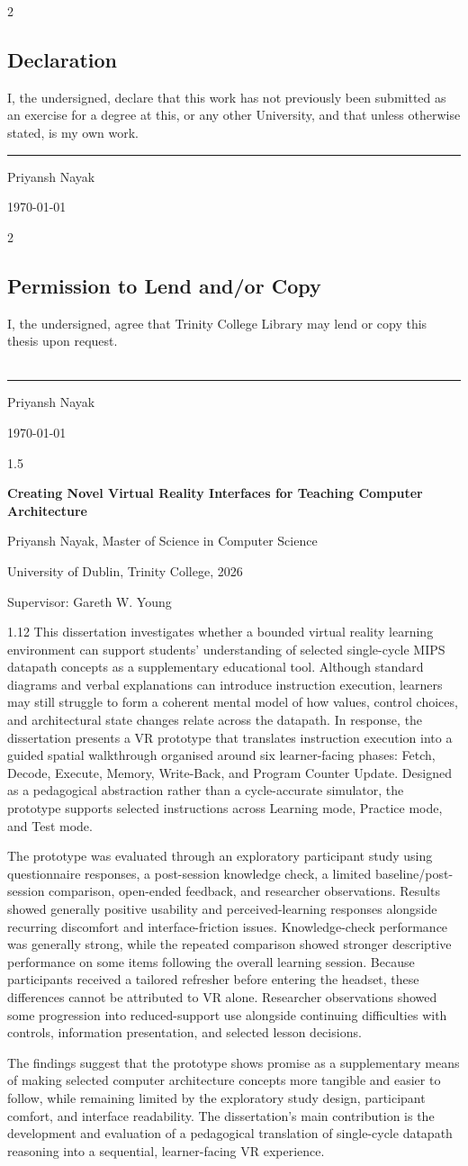 \documentclass[a4paper,12pt,oneside]{report}
\renewcommand{\thesisuniversity}{University of Dublin, Trinity College}
\renewcommand{\thesisauthor}{Priyansh Nayak}
\renewcommand{\thesisyear}{2026}
\renewcommand{\thesistitle}{Creating Novel Virtual Reality Interfaces for Teaching Computer Architecture}
\renewcommand{\thesissupervisor}{Gareth W. Young}
\renewcommand{\thesisdegree}{Master of Science in Computer Science}
\renewcommand{\thesisdeclarationpage}{{
    \thispagestyle{empty}
    \begin{spacing}{2}
    \begin{center}
        \section*{Declaration}
    \end{center}
    \vspace{26mm}

    I, the undersigned, declare that this work has not previously been submitted as an
    exercise for a degree at this, or any other University, and that unless otherwise
    stated, is my own work.

    \vspace{26mm}
    \begin{flushright}
    \begin{minipage}{67mm}
    \raggedright
    \rule{\linewidth}{0.4pt}\par
    \thesisauthor\par
    \vspace{1mm}
    {\today}\par
    \end{minipage}
    \end{flushright}
    \end{spacing}
    \newpage}}
\newcommand{\thesispermissionpage}{{
    \thispagestyle{empty}
    \begin{spacing}{2}
    \begin{center}
        \section*{Permission to Lend and/or Copy}
    \end{center}

    \vspace{26mm}

    I, the undersigned, agree that Trinity College Library may lend or copy this thesis upon
    request. \\ \\

    \vspace{26mm}
    \begin{flushright}
    \begin{minipage}{67mm}
    \raggedright
    \rule{\linewidth}{0.4pt}\par
    \thesisauthor\par
    \vspace{1mm}
    {\today}\par
    \end{minipage}
    \end{flushright}
    \end{spacing}
    \newpage}}
\renewenvironment{thesisabstract}
    {\clearpage
     \thispagestyle{empty}
     \addcontentsline{toc}{chapter}{Abstract}
     \vspace*{0mm}
     \begin{center}
       \begin{spacing}{1.5}
       {\Large \bfseries \thesistitle\par}
       \end{spacing}
       \vspace{10mm}
       {\normalsize \thesisauthor, \thesisdegree \par}
       \vspace{2mm}
       {\normalsize \thesisuniversity, \thesisyear \par}
       \vspace{10mm}
       {\normalsize Supervisor: \thesissupervisor \par}
     \end{center}
     \vspace{7mm}
     \begin{spacing}{1.12}\noindent}
    {\end{spacing}\newpage}
\begin{document}

\thesistitlepage
\thesisdeclarationpage
\thesispermissionpage

\begin{thesisabstract}
This dissertation investigates whether a bounded virtual reality learning environment can support students' understanding of selected single-cycle MIPS datapath concepts as a supplementary educational tool. Although standard diagrams and verbal explanations can introduce instruction execution, learners may still struggle to form a coherent mental model of how values, control choices, and architectural state changes relate across the datapath. In response, the dissertation presents a VR prototype that translates instruction execution into a guided spatial walkthrough organised around six learner-facing phases: Fetch, Decode, Execute, Memory, Write-Back, and Program Counter Update. Designed as a pedagogical abstraction rather than a cycle-accurate simulator, the prototype supports selected instructions across Learning mode, Practice mode, and Test mode.

The prototype was evaluated through an exploratory participant study using questionnaire responses, a post-session knowledge check, a limited baseline/post-session comparison, open-ended feedback, and researcher observations. Results showed generally positive usability and perceived-learning responses alongside recurring discomfort and interface-friction issues. Knowledge-check performance was generally strong, while the repeated comparison showed stronger descriptive performance on some items following the overall learning session. Because participants received a tailored refresher before entering the headset, these differences cannot be attributed to VR alone. Researcher observations showed some progression into reduced-support use alongside continuing difficulties with controls, information presentation, and selected lesson decisions.

The findings suggest that the prototype shows promise as a supplementary means of making selected computer architecture concepts more tangible and easier to follow, while remaining limited by the exploratory study design, participant comfort, and interface readability. The dissertation's main contribution is the development and evaluation of a pedagogical translation of single-cycle datapath reasoning into a sequential, learner-facing VR experience.
\end{thesisabstract}
\end{document}
